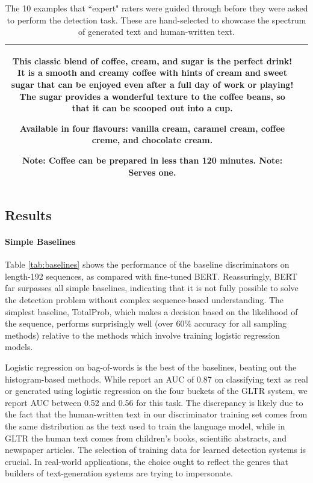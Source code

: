 \begin{table}[]
\begin{tabular}{c|p{5.5in}}
This classic blend of coffee, cream, and sugar is the perfect drink! It is a smooth and creamy coffee with hints of cream and sweet sugar that can be enjoyed even after a full day of work or playing! The sugar provides a wonderful texture to the coffee beans, so that it can be scooped out into a cup.

Available in four flavours: vanilla cream, caramel cream, coffee creme, and chocolate cream.

Note: Coffee can be prepared in less than 120 minutes.
Note: Serves one.
\\
\hline
    \end{tabular}
    \caption{The 10 examples that ``expert" raters were guided through before they were asked to perform the detection task. These are hand-selected to showcase the spectrum of generated text and human-written text.}
    \label{tab:expert_rater_training}
\end{table}


\subsection{Results}

\label{section:auto_detection}
\paragraph{Simple Baselines}
Table \ref{tab:baselines} shows the performance of the baseline discriminators on length-192 sequences, as compared with fine-tuned BERT.
Reassuringly, BERT far surpasses all simple baselines, indicating that it is not fully possible to solve the detection problem without complex sequence-based understanding.
The simplest baseline, TotalProb, which makes a decision based on the likelihood of the sequence, performs surprisingly well (over 60\% accuracy for all sampling methods) relative to the methods which involve training logistic regression models.

Logistic regression on bag-of-words is the best of the baselines, beating out the histogram-based methods.
While \citet{gehrmann2019gltr} report an AUC of 0.87 on classifying text as real or generated using logistic regression on the four buckets of the GLTR system, we report AUC between 0.52 and 0.56 for this task.
The discrepancy is likely due to the fact that the human-written text in our discriminator training set comes from the same distribution as the text used to train the language model, while in GLTR the human text comes from children's books, scientific abstracts, and newspaper articles. 
The selection of training data for learned detection systems is crucial. In real-world applications, the choice ought to reflect the genres that builders of text-generation systems are trying to impersonate. 

